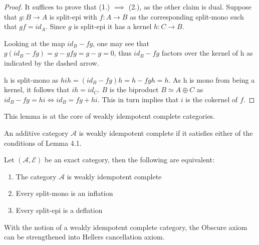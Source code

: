     \begin{proof}
        It suffices to prove that (1.) $\implies$ (2.), as the other claim is dual. Suppose that $g:B\rightarrow A$ is split-epi with $f:A\rightarrow B$ as the corresponding split-mono such that $gf=id_A$. Since $g$ is split-epi it has a kernel $h:C\rightarrow B$.
        
        \begin{center}
        \end{center}

        Looking at the map $id_B-fg$, one may see that $g(id_B-fg)=g-gfg=g-g=0$, thus $id_B-fg$ factors over the kernel of h as indicated by the dashed arrow.

        h is split-mono as $hih = (id_B-fg)h=h-fgh=h$. As h is mono from being a kernel, it follows that $ih=id_C$. $B$ is the biproduct $B\simeq A\oplus C$ as $id_B -fg = hi \iff id_B = fg + hi$. This in turn implies that $i$ is the cokernel of $f$.
    \end{proof}

    This lemma is at the core of weakly idempotent complete categories.

    \begin{definition}
        An additive category $\mathcal{A}$ is weakly idempotent complete if it satisfies either of the conditions of Lemma 4.1.
    \end{definition}

    \begin{corollary}
        Let $(\mathcal{A},\mathcal{E})$ be an exact category, then the following are equivalent:
        \begin{enumerate}
            \item The category $\mathcal{A}$ is weakly idempotent complete
            \item Every split-mono is an inflation
            \item Every split-epi is a deflation
        \end{enumerate}
    \end{corollary}

    With the notion of a weakly idempotent complete category, the Obscure axiom can be strengthened into Hellers cancellation axiom.

